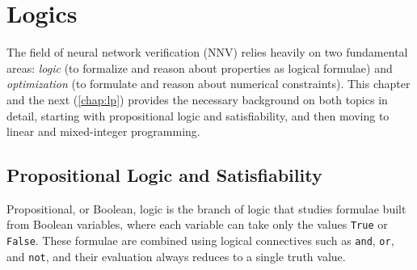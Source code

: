 \documentclass[oneside,11pt,dvipsnames]{book}
\numberwithin{equation}{section}
\theoremstyle{definition}
\theoremstyle{remark}
\begin{document}
\begin{table}
\begin{tabular}{l|l|l}
    \bottomrule
\end{tabular}    
\end{table}

\chapter{Logics}\label{chap:logics}

The field of neural network verification (NNV) relies heavily on two fundamental areas: 
\emph{logic} (to formalize and reason about properties as logical formulae) and \emph{optimization} (to formulate and reason about numerical constraints).
This chapter and the next (\autoref{chap:lp}) provides the necessary background on both topics in detail, starting with propositional logic and satisfiability, 
and then moving to linear and mixed-integer programming.


\section{Propositional Logic and Satisfiability}\label{sec:propositional-logic}

Propositional, or Boolean, logic is the branch of logic that studies formulae built from Boolean variables, where each variable can take only the values \texttt{True} or \texttt{False}. These formulae are combined using logical connectives such as \texttt{and}, \texttt{or}, and \texttt{not}, and their evaluation always reduces to a single truth value.
\end{document}
